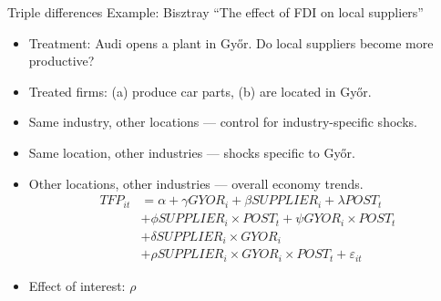 \documentclass[notes=show,beamer,compress]{beamer}
\begin{document}
\begin{frame}{Triple differences}
Example: Bisztray ``The effect of FDI on local suppliers''
\begin{itemize}
	\item{Treatment: Audi opens a plant in Gy\H{o}r}. Do local suppliers become more productive?
	\item{Treated firms: (a) produce car parts, (b) are located in Gy\H{o}r.}
	\item{Same industry, other locations --- control for industry-specific shocks.}
	\item{Same location, other industries --- shocks specific to Gy\H{o}r.}
	\item{Other locations, other industries --- overall economy trends.}
	\begin{align*}
		TFP_{it} &= \alpha + \gamma{}GYOR_i + \beta{}SUPPLIER_i + \lambda{}POST_t \\
		&+ \phi SUPPLIER_i\times POST_t + \psi GYOR_i\times POST_t\\
		&+ \delta SUPPLIER_i\times GYOR_i\\
		&+ \rho SUPPLIER_i\times GYOR_i\times POST_t + \varepsilon_{it}
	\end{align*}
	\item{Effect of interest: $\rho$}
\end{itemize}

\end{frame}
\end{document}
